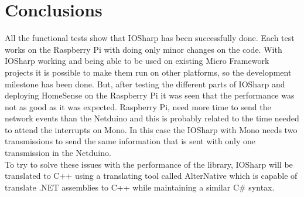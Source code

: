 \section{Conclusions}\label{S:Results-overview}
All the functional tests show that IOSharp has been successfully done. Each test works on the Raspberry Pi with doing only minor changes on the code. With IOSharp working and being able to be used on existing Micro Framework projects it is possible to make them run on other platforms, so the development milestone has been done. But, after testing the different parts of IOSharp and deploying HomeSense on the Raspberry Pi it was seen that the performance was not as good as it was expected. Raspberry Pi, need more time to send the network events than the Netduino and this is probably related to the time needed to attend the interrupts on Mono. In this case the IOSharp with Mono needs two transmissions to send the same information that is sent with only one transmission in the Netduino.
\\
To try to solve these issues with the performance of the library, IOSharp will be translated to C++ using a translating tool called AlterNative which is capable of translate .NET assemblies to C++ while maintaining a similar C\# syntax.